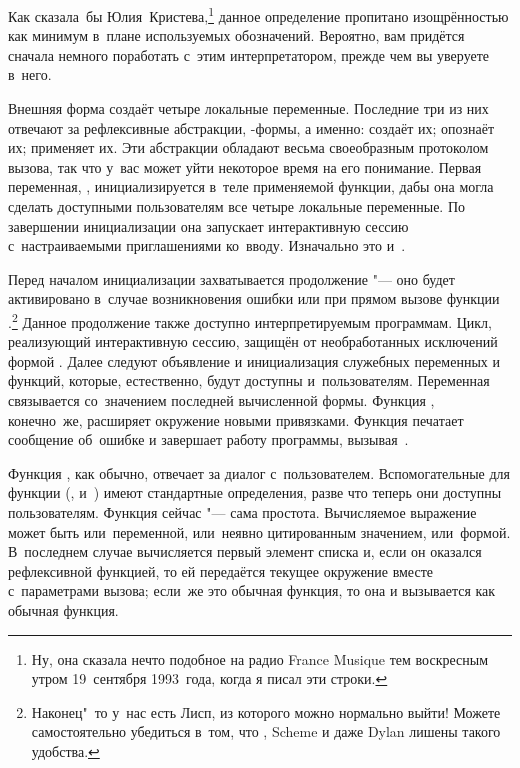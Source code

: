 Как сказала~бы Юлия~Кристева,\footnote*{Ну, она сказала нечто подобное на радио
France Musique тем воскресным утром 19~сентября 1993~года, когда я писал эти
строки.} данное определение пропитано изощрённостью как минимум в~плане
используемых обозначений. Вероятно, вам придётся сначала немного поработать
с~этим интерпретатором, прежде чем вы уверуете в~него.

\indexC{==}
Внешняя форма  создаёт четыре локальные переменные. Последние три из
них отвечают за рефлексивные абстракции, -формы, а именно:
 создаёт их;  опознаёт их; 
применяет их. Эти абстракции обладают весьма своеобразным протоколом вызова, так
что у~вас может уйти некоторое время на его понимание. Первая переменная,
, инициализируется в~теле применяемой функции, дабы она могла
сделать доступными пользователям все четыре локальные переменные. По завершении
инициализации она запускает интерактивную сессию с~настраиваемыми приглашениями
ко~вводу. Изначально это  и~\ic{==}.

Перед началом инициализации захватывается продолжение "--- оно будет
активировано в~случае возникновения ошибки или при прямом вызове функции
.\footnote*{Наконец"~то у~нас есть Лисп, из которого можно нормально
выйти! Можете самостоятельно убедиться в~том, что {\CommonLisp}, Scheme и даже
Dylan лишены такого удобства.} Данное продолжение также доступно
интерпретируемым программам. Цикл, реализующий интерактивную сессию, защищён от
необработанных исключений формой .
 Далее следуют объявление и
инициализация служебных переменных и функций, которые, естественно, будут
доступны и~пользователям. Переменная~ связывается со~значением последней
вычисленной формы. Функция , конечно~же, расширяет окружение новыми
привязками. Функция  печатает сообщение об~ошибке и завершает работу
программы, вызывая~.

Функция , как обычно, отвечает за диалог с~пользователем.
Вспомогательные для  функции (,  и~)
имеют стандартные определения, разве что теперь они доступны пользователям.
Функция  сейчас "--- сама простота. Вычисляемое выражение может быть
или~переменной, или~неявно цитированным значением, или~формой. В~последнем
случае вычисляется первый элемент списка и, если он оказался рефлексивной
функцией, то ей передаётся текущее окружение вместе с~параметрами вызова;
если~же это обычная функция, то она и вызывается как обычная функция.

